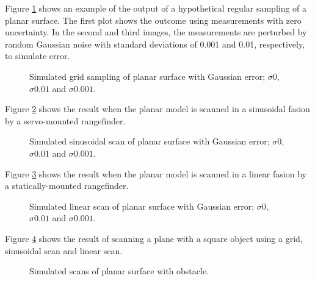 \documentclass[10pt,a4paper]{report}
\begin{document}
Figure \ref{fig:point_plane} shows an example of the output of a hypothetical regular sampling of a planar surface. The first plot shows the outcome using measurements with zero uncertainty. In the second and third images, the measurements are perturbed by random Gaussian noise with standard deviations of 0.001 and 0.01, respectively, to simulate error.

\begin{figure}
\centering
\def\svgscale{0.4}

\def\svgscale{0.4}

\def\svgscale{0.4}

\caption{Simulated grid sampling of planar surface with Gaussian error; $\sigma 0$, $\sigma 0.01$ and $\sigma 0.001$.}
\label{fig:point_plane}
\end{figure}


Figure \ref{fig:sinus_plane} shows the result when the planar model is scanned in a sinusoidal fasion by a servo-mounted rangefinder.

\begin{figure}
\centering
\def\svgscale{0.4}

\def\svgscale{0.4}

\def\svgscale{0.4}

\caption{Simulated sinusoidal scan of planar surface with Gaussian error; $\sigma 0$, $\sigma 0.01$ and $\sigma 0.001$.}
\label{fig:sinus_plane}
\end{figure}


Figure \ref{fig:linear_plane} shows the result when the planar model is scanned in a linear fasion by a statically-mounted rangefinder.

\begin{figure}
\centering
\def\svgscale{0.4}

\def\svgscale{0.4}

\def\svgscale{0.4}

\caption{Simulated linear scan of planar surface with Gaussian error; $\sigma 0$, $\sigma 0.01$ and $\sigma 0.001$.}
\label{fig:linear_plane}
\end{figure}

Figure \ref{fig:plane_object} shows the result of scanning a plane with a square object using a grid, sinusoidal scan and linear scan.

\begin{figure}
\centering
\def\svgscale{0.4}

\def\svgscale{0.4}

\def\svgscale{0.4}

\caption{Simulated scans of planar surface with obstacle.}
\label{fig:plane_object}
\end{figure}
\end{document}
